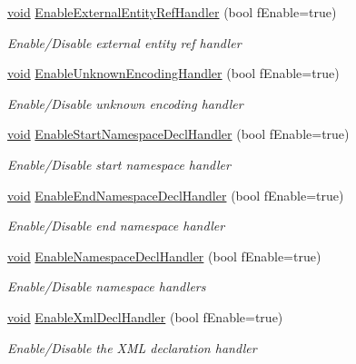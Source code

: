 \begin{DoxyCompactItemize}
\hyperlink{_cpclient_8h_a6464f7480a0fd0ee170cba12b2c0497f}{void} \hyperlink{class_c_expat_impl_a792a4fedfcde46489c261e692eea54f4}{\-Enable\-External\-Entity\-Ref\-Handler} (bool f\-Enable=true)
\begin{DoxyCompactList}\small\item\em \-Enable/\-Disable external entity ref handler \end{DoxyCompactList}\item 
\hyperlink{_cpclient_8h_a6464f7480a0fd0ee170cba12b2c0497f}{void} \hyperlink{class_c_expat_impl_a784e4d39f69b56f02d3e2a85eaeb641b}{\-Enable\-Unknown\-Encoding\-Handler} (bool f\-Enable=true)
\begin{DoxyCompactList}\small\item\em \-Enable/\-Disable unknown encoding handler \end{DoxyCompactList}\item 
\hyperlink{_cpclient_8h_a6464f7480a0fd0ee170cba12b2c0497f}{void} \hyperlink{class_c_expat_impl_ac675f52624f52b3cdaa57b86d97d7f51}{\-Enable\-Start\-Namespace\-Decl\-Handler} (bool f\-Enable=true)
\begin{DoxyCompactList}\small\item\em \-Enable/\-Disable start namespace handler \end{DoxyCompactList}\item 
\hyperlink{_cpclient_8h_a6464f7480a0fd0ee170cba12b2c0497f}{void} \hyperlink{class_c_expat_impl_ae3938fc6542d2f56c88934dd4d7c70ee}{\-Enable\-End\-Namespace\-Decl\-Handler} (bool f\-Enable=true)
\begin{DoxyCompactList}\small\item\em \-Enable/\-Disable end namespace handler \end{DoxyCompactList}\item 
\hyperlink{_cpclient_8h_a6464f7480a0fd0ee170cba12b2c0497f}{void} \hyperlink{class_c_expat_impl_a7b3c35dc2f667aa146f346a2b437bd54}{\-Enable\-Namespace\-Decl\-Handler} (bool f\-Enable=true)
\begin{DoxyCompactList}\small\item\em \-Enable/\-Disable namespace handlers \end{DoxyCompactList}\item 
\hyperlink{_cpclient_8h_a6464f7480a0fd0ee170cba12b2c0497f}{void} \hyperlink{class_c_expat_impl_afffef6ef64c80c88786cf06b4ba9e776}{\-Enable\-Xml\-Decl\-Handler} (bool f\-Enable=true)
\begin{DoxyCompactList}\small\item\em \-Enable/\-Disable the \-X\-M\-L declaration handler \end{DoxyCompactList}\item 

\end{DoxyCompactItemize}
